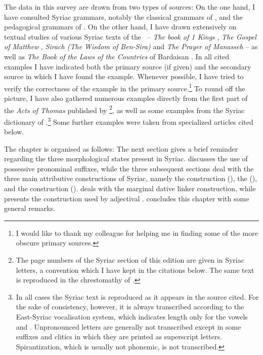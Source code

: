 The data in this survey are drawn from two types of sources: On the one hand, I have consulted Syriac grammars, notably the classical grammars of \citet{NoldekeSyriac}, \citet{DuvalSyriaque} and the pedagogical grammars of \citet{MuraokaSyriac, MuraokaHebraists}. On the other hand, I have drawn extensively on textual studies of various Syriac texts of the \Pesh\ -- \textit{The book of 1 Kings} \citep{WilliamsKings}, \textit{The Gospel of Matthew} \citep{JoostenMatthew},
\textit{Sirach (The Wisdom of Ben-Sira)} \citep{PeursenBenSira} and \textit{The Prayer of Manasseh} \citep{GutmanVanPeursen} -- as well as \textit{The Book of the Laws of the Countries} of Bardaisan \citep{BakkerBardaisan}. In all cited examples I have indicated both the primary source (if given) and the secondary source in which I have found the example. Whenever possible, I have tried to verify the correctness of the example in the primary source.\footnote{I would like to thank my colleague  for helping me in finding some of the more obscure primary sources.} To round off the picture, I have also gathered numerous examples directly from the first part of the \textit{Acts of Thomas} published by \citet[--]{WrightActs}\footnote{The page numbers of the Syriac section of this edition are given in Syriac letters, a convention which I have kept in the citations below. The same text is reproduced in the chrestomathy of \cite[30*--40*]{MuraokaSyriac}.}, as well as some examples from the Syriac dictionary of \citet{CSD}.\footnote{In all cases the Syriac text is reproduced as it appears in the source cited. For the sake of consistency, however, it is always transcribed according to the East-Syriac vocalisation system, which indicates length only for the vowels  and . Unpronounced letters are generally not transcribed except in some suffixes and clitics in which they are printed as superscript letters. Spirantization, which is  usually not  phonemic, is not transcribed.} Some further examples were taken from specialized articles cited below. 

The chapter is organised as follows: The next section gives a brief reminder regarding the three morphological states present in Syriac.  discusses the use of possessive pronominal suffixes, while the three subsequent sections deal with the three main attributive constructions of Syriac, namely the  construction (), the  (), and the  construction ().  deals with the marginal dative linker construction, while  presents the  construction used by adjectival \secns.  concludes this chapter with some general remarks.


